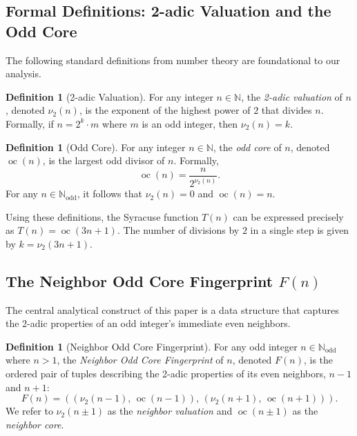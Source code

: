 \documentclass[12pt]{article}
\theoremstyle{plain}
\theoremstyle{definition}
\newtheorem{definition}[theorem]{Definition}
\begin{document}
\subsection{Formal Definitions: 2-adic Valuation and the Odd Core}

The following standard definitions from number theory are foundational to our analysis.

\begin{definition}[2-adic Valuation]
For any integer $n \in \mathbb{N}$, the \emph{2-adic valuation} of $n$, denoted $\nu_2(n)$, is the exponent of the highest power of $2$ that divides $n$. Formally, if $n = 2^k \cdot m$ where $m$ is an odd integer, then $\nu_2(n) = k$.
\end{definition}

\begin{definition}[Odd Core]
For any integer $n \in \mathbb{N}$, the \emph{odd core} of $n$, denoted $\operatorname{oc}(n)$, is the largest odd divisor of $n$. Formally,
\[
\operatorname{oc}(n) = \frac{n}{2^{\nu_2(n)}}.
\]
For any $n \in \mathbb{N}_{\text{odd}}$, it follows that $\nu_2(n) = 0$ and $\operatorname{oc}(n) = n$.
\end{definition}

Using these definitions, the Syracuse function $T(n)$ can be expressed precisely as $T(n) = \operatorname{oc}(3n+1)$. The number of divisions by $2$ in a single step is given by $k = \nu_2(3n+1)$.

\subsection{The Neighbor Odd Core Fingerprint $F(n)$}

The central analytical construct of this paper is a data structure that captures the 2-adic properties of an odd integer's immediate even neighbors.

\begin{definition}[Neighbor Odd Core Fingerprint]
For any odd integer $n \in \mathbb{N}_{\text{odd}}$ where $n > 1$, the \emph{Neighbor Odd Core Fingerprint} of $n$, denoted $F(n)$, is the ordered pair of tuples describing the 2-adic properties of its even neighbors, $n-1$ and $n+1$:
\[
F(n) = \left( \left( \nu_2(n-1),\, \operatorname{oc}(n-1) \right),\, \left( \nu_2(n+1),\, \operatorname{oc}(n+1) \right) \right).
\]
We refer to $\nu_2(n \pm 1)$ as the \emph{neighbor valuation} and $\operatorname{oc}(n \pm 1)$ as the \emph{neighbor core}.
\end{definition}
\end{document}
